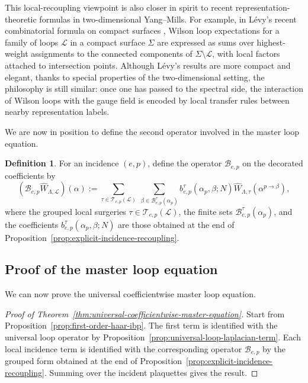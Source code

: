 \documentclass[11pt,a4paper,reqno]{article}
\theoremstyle{definition}
\newtheorem{definition}[theorem]{Definition}
\theoremstyle{remark}
\newcommand\Lc{{\mathcal{L}}}
\newcommand\B{{\mathcal{B}}}
\begin{document}
This local-recoupling viewpoint is also closer in spirit to recent representation-theoretic formulas in two-dimensional Yang--Mills. For example, in L\'evy's recent combinatorial formula on compact surfaces \cite{Lev26}, Wilson loop expectations for a family of loops $\Lc$ in a compact surface $\Sigma$ are expressed as sums over highest-weight assignments to the connected components of $\Sigma\setminus\Lc$, with local factors attached to intersection points. Although L\'evy's results are more compact and elegant, thanks to special properties of the two-dimensional setting, the philosophy is still similar: once one has passed to the spectral side, the interaction of Wilson loops with the gauge field is encoded by local transfer rules between nearby representation labels.

We are now in position to define the second operator involved in the master loop equation.

\begin{definition}
For an incidence $(e,p)$, define the operator $\mathscr{B}_{e,p}$ on the decorated coefficients by
\[
(\mathscr{B}_{e,p}\widehat{W}_{\Lambda,\Lc})(\alpha):=\sum_{\tau\in\mathcal T_{e,p}(\Lc)}\ \sum_{\beta\in \B^\tau_{e,p}(\alpha_p)}b^\tau_{e,p}(\alpha_p,\beta;N)\widehat{W}_{\Lambda,\tau}(\alpha^{p\to \beta}),
\]
where the grouped local surgeries $\tau\in \mathcal T_{e,p}(\Lc)$, the finite sets $\B^\tau_{e,p}(\alpha_p)$, and the coefficients $b^\tau_{e,p}(\alpha_p,\beta;N)$ are those obtained at the end of Proposition~\ref{prop:explicit-incidence-recoupling}.
\end{definition}

\subsection{Proof of the master loop equation}

We can now prove the universal coefficientwise master loop equation.

\begin{proof}[Proof of Theorem~\ref{thm:universal-coefficientwise-master-equation}]
Start from Proposition~\ref{prop:first-order-haar-ibp}. The first term is identified with the universal loop operator by Proposition~\ref{prop:universal-loop-laplacian-term}. Each local incidence term is identified with the corresponding operator $\mathscr{B}_{e,p}$ by the grouped form obtained at the end of Proposition~\ref{prop:explicit-incidence-recoupling}. Summing over the incident plaquettes gives the result.
\end{proof}
\end{document}
